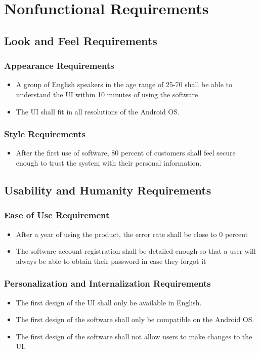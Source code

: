 \documentclass[12pt]{article}
\begin{document}
\section{Nonfunctional Requirements}
\setcounter{subsection}{9}
\subsection{Look and Feel Requirements}
\subsubsection{Appearance Requirements}
\begin{itemize}
\item A group of English speakers in the age range of 25-70 shall be able to understand the UI within 10 minutes of using the software.
\item The UI shall fit in all resolutions of the Android OS.
\end{itemize}

\subsubsection{Style Requirements}
\begin{itemize}
\item After the first use of software, 80 percent of customers shall feel secure enough to trust the system with their personal information.
\end{itemize}

\subsection{Usability and Humanity Requirements}
\subsubsection{Ease of Use Requirement}
\begin{itemize}
\item After a year of using the product, the error rate shall be close to 0 percent
\item The software account registration shall be detailed enough so that a user will always be able to obtain their password in case they forgot it
\end{itemize}

\subsubsection{Personalization and Internalization Requirements}
\begin{itemize}
\item The first design of the UI shall only be available in English.
\item The first design of the software shall only be compatible on the Android OS.
\item The first design of the software shall not allow users to make changes to the UI.
\end{itemize}
\end{document}
